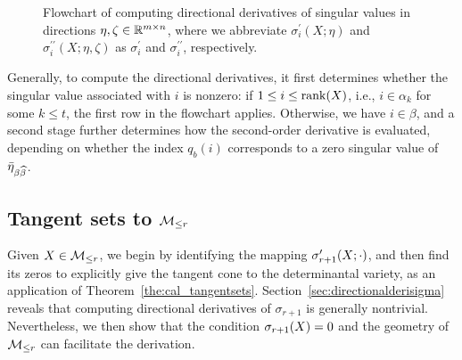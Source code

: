 \begin{figure}[htbp]
{
}
\caption{Flowchart of computing directional derivatives of singular values in directions $\eta,\zeta\in\mathbb{R}^{m\times n}$, where we abbreviate $\sigma_i^\prime(X;\eta)$ and $\sigma_i^{\prime\prime}(X;\eta,\zeta)$ as $\sigma_i^\prime$ and $\sigma_i^{\prime\prime}$, respectively.}
\label{fig:flowchart_2ndderivative}
\end{figure}


Generally, to compute the directional derivatives, it first determines whether the singular value associated with $i$ is nonzero: if $1\le i\le\operatorname{rank}(X)$, i.e., $i\in\alpha_k$ for some $k\le t$, the first row in the flowchart applies. Otherwise, we have $i\in\beta$, and a second stage further determines how the second-order derivative is evaluated, depending on whether the index $q_b(i)$ corresponds to a zero singular value of $\bar{\eta}_{\beta\widehat{\beta}}$.

\subsection{Tangent sets to $\mathcal{M}_{\le r}$}\label{sec:tangenttoMr}
Given $X\in\mathcal{M}_{\le r}$, we begin by identifying the mapping $\sigma_{r+1}^{\prime}(X;\cdot)$, and then find its zeros to explicitly give the tangent cone to the determinantal variety, as an application of Theorem~\ref{the:cal_tangentsets}. Section~\ref{sec:directionalderisigma} reveals that computing directional derivatives of $\sigma_{r+1}$ is generally nontrivial. Nevertheless, we then show that the condition $\sigma_{r+1}(X)=0$ and the geometry of $\mathcal{M}_{\le r}$ can facilitate the derivation.


